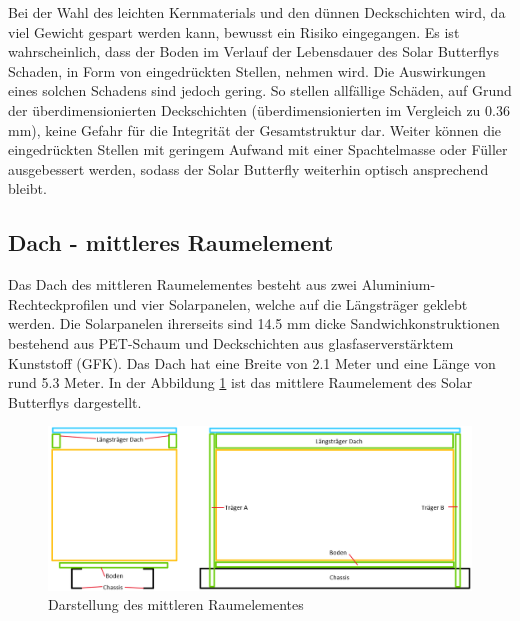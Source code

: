 Bei der Wahl des leichten Kernmaterials und den dünnen Deckschichten wird, da viel Gewicht gespart werden kann, bewusst ein Risiko eingegangen. Es ist wahrscheinlich, dass der Boden im Verlauf der Lebensdauer des Solar Butterflys Schaden, in Form von eingedrückten Stellen, nehmen wird. Die Auswirkungen eines solchen Schadens sind jedoch gering. So stellen allfällige Schäden, auf Grund der überdimensionierten Deckschichten (überdimensionierten im Vergleich zu 0.36 mm), keine Gefahr für die Integrität der Gesamtstruktur dar. Weiter können die eingedrückten Stellen mit geringem Aufwand mit einer Spachtelmasse oder Füller ausgebessert werden, sodass der Solar Butterfly weiterhin optisch ansprechend bleibt.

\subsection{Dach - mittleres Raumelement}
\label{sec:Dach}
Das Dach des mittleren Raumelementes besteht aus zwei Aluminium-Rechteckprofilen und vier Solarpanelen, welche auf die Längsträger geklebt werden. Die Solarpanelen ihrerseits sind 14.5 mm dicke Sandwichkonstruktionen bestehend aus PET-Schaum und Deckschichten aus glasfaserverstärktem Kunststoff (GFK). Das Dach hat eine Breite von 2.1 Meter und eine Länge von rund 5.3 Meter. In der Abbildung \ref{img:Dach} ist das mittlere Raumelement des Solar Butterflys dargestellt.\\

\begin{figure}[h]
  \includegraphics[width=\linewidth]{04_Figures/Dach.png}
  \caption{Darstellung des mittleren Raumelementes}
  \label{img:Dach}
\end{figure}

